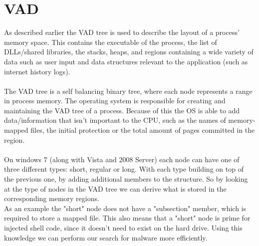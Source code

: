 \documentclass[a4paper]{article}
\begin{document}
\newpage
\section{VAD}

As described earlier the VAD tree is used to describe the layout of a process' memory space. This contains the executable of the process, the list of DLLs/shared libraries, the stacks, heaps, and regions containing a wide variety of data such as user input and data structures relevant to the application (such as internet history logs). \\ \\
The VAD tree is a self balancing binary tree, where each node represents a range in process memory. The operating system is responsible for creating and maintaining the VAD tree of a process. Because of this the OS is able to add data/information that isn't important to the CPU, such as the names of memory-mapped files, the initial protection or the total amount of pages committed in the region. \\ \\
On windows 7 (along with Vista and 2008 Server) each node can have one of three different types: short, regular or long. With each type building on top of the previous one, by adding additional members to the structure. So by looking at the type of nodes in the VAD tree we can derive what is stored in the corresponding memory regions. \\
As an example the "short" node does not have a "subsection" member, which is required to store a mapped file. This also means that a "short" node is prime for injected shell code, since it doesn't need to exist on the hard drive. Using this knowledge we can perform our search for malware more efficiently. \\ \\
\end{document}
